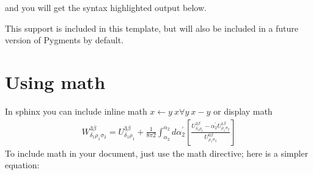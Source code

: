 \documentclass[letterpaper,10pt,english]{sphinxmanual}
\begin{document}
\begin{sphinxVerbatim}[commandchars=\\\{\}]
  

     \PYG{p}{[}\PYG{p}{]}   \PYG{p}{[}\PYG{p}{]}

     \PYG{p}{[}\PYG{p}{]} 
       
       \PYG{p}{[}  \PYG{p}{]}
         \PYG{p}{[}  \PYG{p}{]}
\end{sphinxVerbatim}

\sphinxAtStartPar
and you will get the syntax highlighted output below.

\begin{sphinxVerbatim}[commandchars=\\\{\}]
 \PYG{p}{[}\PYG{p}{]}   \PYG{p}{[}\PYG{p}{]}

 \PYG{p}{[}\PYG{p}{]} 
   
   \PYG{p}{[}  \PYG{p}{]}
     \PYG{p}{[}  \PYG{p}{]}
\end{sphinxVerbatim}

\sphinxAtStartPar
This support is included in this template, but will also be included
in a future version of Pygments by default.


\section{Using math}
\label{\detokenize{chapter2:using-math}}\label{\detokenize{chapter2:id1}}
\sphinxAtStartPar
In sphinx you can include inline math \(x\leftarrow y\ x\forall
y\ x-y\) or display math
\begin{equation*}
\begin{split}W^{3\beta}_{\delta_1 \rho_1 \sigma_2} = U^{3\beta}_{\delta_1 \rho_1} + \frac{1}{8 \pi 2} \int^{\alpha_2}_{\alpha_2} d \alpha^\prime_2 \left[\frac{ U^{2\beta}_{\delta_1 \rho_1} - \alpha^\prime_2U^{1\beta}_{\rho_1 \sigma_2} }{U^{0\beta}_{\rho_1 \sigma_2}}\right]\end{split}
\end{equation*}
\sphinxAtStartPar
To include math in your document, just use the math directive; here is
a simpler equation:
\end{document}
